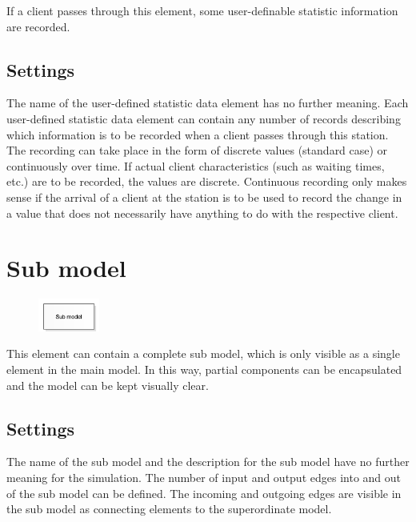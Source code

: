 If a client passes through this element, some user-definable statistic information are recorded.

\subsection*{Settings}

The name of the user-defined statistic data element has no further meaning.
Each user-defined statistic data element can contain any number of records
describing which information is to be recorded when a client passes through
this station. The recording can take place in the form of discrete values
(standard case) or continuously over time. If actual client characteristics
(such as waiting times, etc.) are to be recorded, the values are discrete.
Continuous recording only makes sense if the arrival of a client at the station
is to be used to record the change in a value that does not necessarily have
anything to do with the respective client.


\section{Sub model}
\label{ref:ModelElementSub}

\begin{figure}
\vspace{-22pt}
\includegraphics[width=2cm]{imageModelElementSub.png}
\vspace{-22pt}
\end{figure}

This element can contain a complete sub model, which is only visible as a single element in the main model.
In this way, partial components can be encapsulated and the model can be kept visually clear.

\subsection*{Settings}

The name of the sub model and the description for the sub model have
no further meaning for the simulation.
The number of input and output edges into and out of the sub model can
be defined. The incoming and outgoing edges are visible in the sub model
as connecting elements to the superordinate model.






